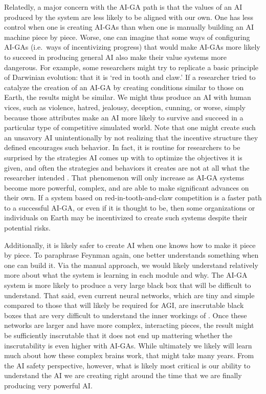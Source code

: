 \documentclass{article}
\begin{document}
Relatedly, a major concern with the AI-GA path is that the values of an AI produced by the system are less likely to be aligned with our own. One has less control when one is creating AI-GAs than when one is manually building an AI machine piece by piece. Worse, one can imagine that some ways of configuring AI-GAs (i.e.\ ways of incentivizing progress) that would make AI-GAs more likely to succeed in producing general AI also make their value systems more dangerous. For example, some researchers might try to replicate a basic principle of Darwinian evolution: that it is `red in tooth and claw.' If a researcher tried to catalyze the creation of an AI-GA by creating conditions similar to those on Earth, the results might be similar. We might thus produce an AI with human vices, such as violence, hatred, jealousy, deception, cunning, or worse, simply because those attributes make an AI more likely to survive and succeed in a particular type of competitive simulated world. Note that one might create such an unsavory AI unintentionally by not realizing that the incentive structure they defined encourages such behavior. In fact, it is routine for researchers to be surprised by the strategies AI comes up with to optimize the objectives it is given, and often the strategies and behaviors it creates are not at all what the researcher intended \cite{lehman2018surprising}. That phenomenon will only increase as AI-GA systems become more powerful, complex, and are able to make significant advances on their own. If a system based on red-in-tooth-and-claw competition is a faster path to a successful AI-GA, or even if it is thought to be, then some organizations or individuals on Earth may be incentivized to create such systems despite their potential risks.

Additionally, it is likely safer to create AI when one knows how to make it piece by piece. To paraphrase Feynman again, one better understands something when one can build it. Via the manual approach, we would likely understand relatively more about what the system is learning in each module and why. The AI-GA system is more likely to produce a very large black box that will be difficult to understand. That said, even current neural networks, which are tiny and simple compared to those that will likely be required for AGI, are inscrutable black boxes that are very difficult to understand the inner workings of \cite{nguyen2015deep,nguyen2016multifaceted,nguyen2017plug,nguyen2016synthesizing,yosinski2015understanding,li2016convergent, yosinski2014transferable,szegedy2013intriguing,mahendran2014understanding,zeiler2014visualizing,li2015visualizing,greydanus2017visualizing}. Once these networks are larger and have more complex, interacting pieces, the result might be sufficiently inscrutable that it does not end up mattering whether the inscrutability is even higher with AI-GAs. While ultimately we likely will learn much about how these complex brains work, that might take many years. From the AI safety perspective, however, what is likely most critical is our ability to understand the AI we are creating right around the time that we are finally producing very powerful AI.  
\end{document}
